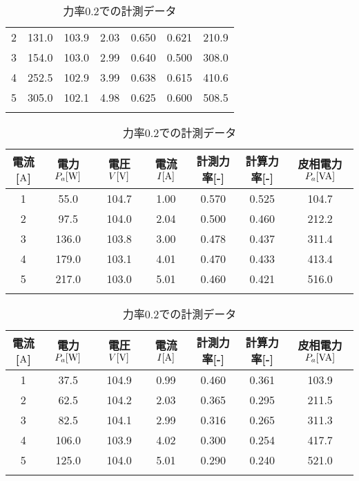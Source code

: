 \begin{itemize}
\begin{table}[h]
\begin{tabular}{ccccccc}
	2 & 131.0 & 103.9 & 2.03 & 0.650 & 0.621 & 210.9 \\
	3 & 154.0 & 103.0 & 2.99 & 0.640 & 0.500 & 308.0 \\
	4 & 252.5 & 102.9 & 3.99 & 0.638 & 0.615 & 410.6 \\
	5 & 305.0 & 102.1 & 4.98 & 0.625 & 0.600 & 508.5 \\ \hline\\
\end{tabular}
	\caption{力率$0.4$での計測データ}
	\label{tab:0.4data}
\begin{tabular}{ccccccc}
	\hline
	電流[$\rm{A}$] & 電力$P_a[\rm{W}]$ & 電圧$V[\rm{V}]$ & 電流$I[\rm{A}]$ & 計測力率[-] & 計算力率[-] & 皮相電力$P_a[\rm{VA}]$ \\ \hline
	1 & 55.0  & 104.7 & 1.00 & 0.570 & 0.525 & 104.7 \\
	2 & 97.5  & 104.0 & 2.04 & 0.500 & 0.460 & 212.2 \\
	3 & 136.0 & 103.8 & 3.00 & 0.478 & 0.437 & 311.4 \\
	4 & 179.0 & 103.1 & 4.01 & 0.470 & 0.433 & 413.4 \\
	5 & 217.0 & 103.0 & 5.01 & 0.460 & 0.421 & 516.0 \\ \hline\\
\end{tabular}
\caption{力率$0.2$での計測データ}
	\label{tab:0.4data}
\begin{tabular}{ccccccc}
	\hline
	電流[$\rm{A}$] & 電力$P_a[\rm{W}]$ & 電圧$V[\rm{V}]$ & 電流$I[\rm{A}]$ & 計測力率[-] & 計算力率[-] & 皮相電力$P_a[\rm{VA}]$ \\ \hline
	1 & 37.5  & 104.9 & 0.99 & 0.460 & 0.361 & 103.9 \\
	2 & 62.5  & 104.2 & 2.03 & 0.365 & 0.295 & 211.5 \\
	3 & 82.5  & 104.1 & 2.99 & 0.316 & 0.265 & 311.3 \\
	4 & 106.0 & 103.9 & 4.02 & 0.300 & 0.254 & 417.7 \\
	5 & 125.0 & 104.0 & 5.01 & 0.290 & 0.240 & 521.0 \\ \hline\\
\end{tabular}
\end{table}
\end{itemize}